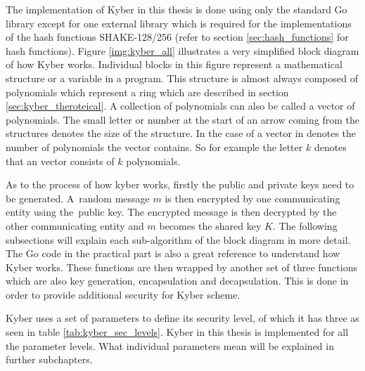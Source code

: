The implementation of Kyber in this thesis is done using only the standard Go library except for one external library \cite{00fV2cvg7Z6H2tS3} which is required for the implementations of the hash functions SHAKE-128/256 (refer to section \ref{sec:hash_functions} for hash functions). Figure \ref{img:kyber_all} illustrates a very simplified block diagram of how Kyber works. Individual blocks in this figure represent a mathematical structure or a variable in a program. This structure is almost always composed of polynomials which represent a ring which are described in section \ref{sec:kyber_theroteical}. A collection of polynomials can also be called a vector of polynomials. The small letter or number at the start of an arrow coming from the structures denotes the size of the structure. In the case of a vector in denotes the number of polynomials the vector contains. So for example the letter $k$ denotes that an vector consists of $k$ polynomials.

As to the process of how kyber works, firstly the public and private keys need to be generated. A~random message $m$ is then encrypted by one communicating entity using the~public key. The encrypted message is then decrypted by the other communicating entity and $m$ becomes the shared key $K$. The following subsections will explain each sub-algorithm of the block diagram in more detail. The Go code in the practical part is also a great reference to understand how Kyber works. These functions are then wrapped by another set of three functions which are also key generation, encapsulation and decapsulation. This is done in order to provide additional security for Kyber scheme.


Kyber uses a set of parameters to define its security level, of which it has three as seen in table \ref{tab:kyber_sec_levels}. Kyber in this thesis is implemented for all the parameter levels. What individual parameters mean will be explained in further subchapters.
